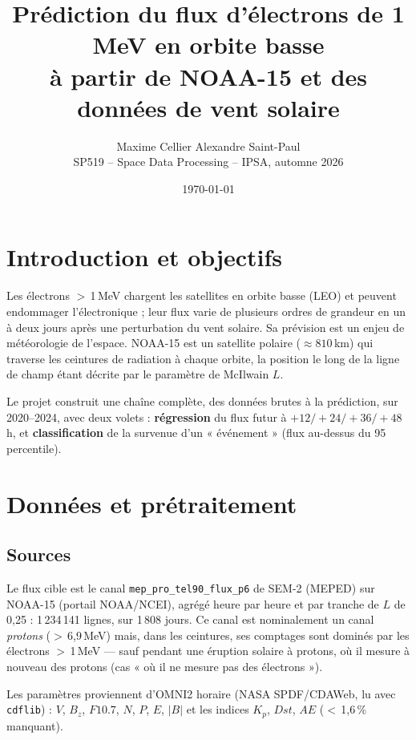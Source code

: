 \documentclass[11pt,a4paper]{article}
\title{\vspace{-1.6cm}\textbf{Prédiction du flux d'électrons de 1 MeV en orbite basse\\ à partir de NOAA-15 et des données de vent solaire}}
\author{Maxime Cellier \quad\textbullet\quad Alexandre Saint-Paul \\[2pt]
        \small SP519 -- Space Data Processing -- IPSA, automne 2026}
\date{\today}
\begin{document}
\maketitle
\vspace{-0.7cm}

\section{Introduction et objectifs}

Les électrons $>$\,1\,MeV chargent les satellites en orbite basse (LEO) et peuvent endommager
l'électronique ; leur flux varie de plusieurs ordres de grandeur en un à deux jours après une
perturbation du vent solaire. Sa prévision est un enjeu de météorologie de l'espace. NOAA-15 est
un satellite polaire ($\approx 810$\,km) qui traverse les ceintures de radiation à chaque orbite,
la position le long de la ligne de champ étant décrite par le paramètre de McIlwain $L$.

Le projet construit une chaîne complète, des données brutes à la prédiction, sur 2020--2024, avec
deux volets : \textbf{régression} du flux futur à $+12/+24/+36/+48$\,h, et \textbf{classification}
de la survenue d'un « événement » (flux au-dessus du 95\ieme{} percentile).

\section{Données et prétraitement}

\subsection{Sources}
Le flux cible est le canal \texttt{mep\_pro\_tel90\_flux\_p6} de SEM-2 (MEPED) sur NOAA-15
(portail NOAA/NCEI), agrégé heure par heure et par tranche de $L$ de 0,25 : 1\,234\,141 lignes,
sur 1\,808 jours. Ce canal est nominalement un canal \emph{protons} ($>$\,6,9\,MeV) mais, dans
les ceintures, ses comptages sont dominés par les électrons $>$\,1\,MeV — sauf pendant une
éruption solaire à protons, où il mesure à nouveau des protons (cas « où il ne mesure pas des
électrons »).

Les paramètres proviennent d'OMNI2 horaire (NASA SPDF/CDAWeb, lu avec \texttt{cdflib}) : $V$,
$B_z$, $F10.7$, $N$, $P$, $E$, $|B|$ et les indices $K_p$, $Dst$, $AE$ ($<$\,1,6\,\% manquant).
\end{document}
